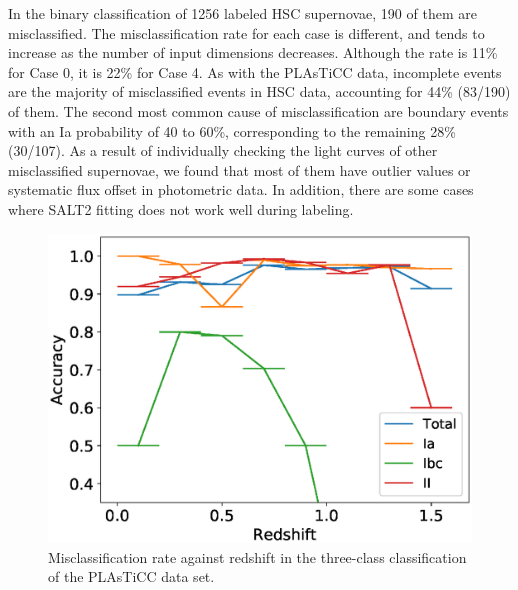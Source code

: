 \documentclass[useamsfonts]{pasj01}
\begin{document}
In the binary classification of 1256 labeled HSC supernovae, 190 of them are misclassified.
The misclassification rate for each case is different, and tends to increase as the number of input dimensions decreases.
Although the rate is 11\% for Case 0, it is 22\% for Case 4.
As with the PLAsTiCC data, incomplete events are the majority of misclassified events in HSC data, accounting for 44\% (83/190) of them.
The second most common cause of misclassification are boundary events with an Ia probability of 40 to 60\%, corresponding to the remaining 28\% (30/107).
As a result of individually checking the light curves of other misclassified supernovae, we found that most of them have outlier values or systematic flux offset in photometric data.
In addition, there are some cases where SALT2 fitting does not work well during labeling.
%
\begin{figure}[ht]
  \begin{center}
     \includegraphics[width=\columnwidth]{figures/misclass_rate_plastic_3class.eps}
  \end{center}
  \caption{%
  Misclassification rate against redshift in the three-class classification of the PLAsTiCC data set.
  }%
  \label{fig:misclass_rate_3class}
\end{figure}
%
%
\end{document}
